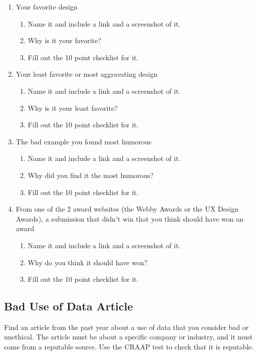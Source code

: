 \documentclass[12pt]{article}
\begin{document}
    \begin{enumerate}
        \item Your favorite design
        \begin{enumerate}
            \item Name it and include a link and a screenshot of it.
            \item Why is it your favorite?
            \item Fill out the 10 point checklist for it.
        \end{enumerate}
        \item Your least favorite or most aggravating design
        \begin{enumerate}
            \item Name it and include a link and a screenshot of it.
            \item Why is it your least favorite?
            \item Fill out the 10 point checklist for it.
        \end{enumerate}
        \item The bad example you found most humorous
        \begin{enumerate}
            \item Name it and include a link and a screenshot of it.
            \item Why did you find it the most humorous?
            \item Fill out the 10 point checklist for it.
        \end{enumerate}
        \item From one of the 2 award websites (the Webby Awards or the UX Design Awards), a submission that didn't win that you think should have won an award
        \begin{enumerate}
            \item Name it and include a link and a screenshot of it.
            \item Why do you think it should have won?
            \item Fill out the 10 point checklist for it.
        \end{enumerate}
    \end{enumerate}

\subsection*{Bad Use of Data Article}
Find an article from the past year about a use of data that you consider bad or unethical. The article must be about a specific company or industry, and it must come from a reputable source. Use the CRAAP test to check that it is reputable.
\end{document}
